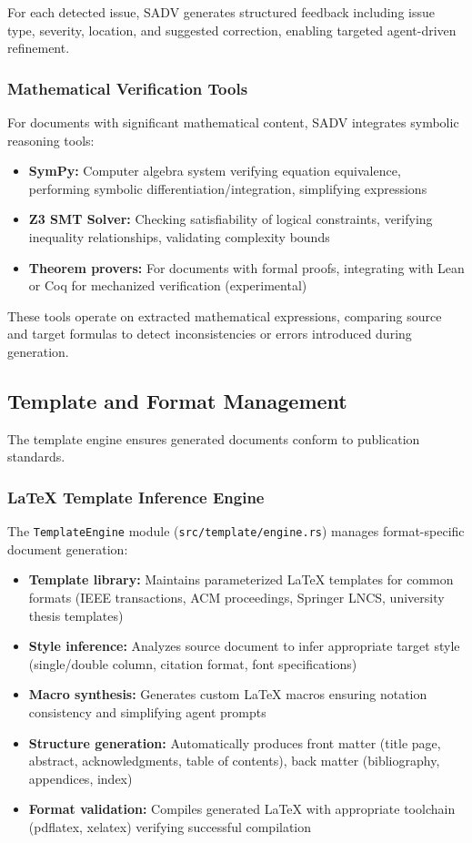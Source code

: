 \documentclass{ieeeaccess}
\begin{document}
For each detected issue, SADV generates structured feedback including issue type, severity, location, and suggested correction, enabling targeted agent-driven refinement.

\subsubsection{Mathematical Verification Tools}

For documents with significant mathematical content, SADV integrates symbolic reasoning tools:

\begin{itemize}
\item \textbf{SymPy:} Computer algebra system verifying equation equivalence, performing symbolic differentiation/integration, simplifying expressions
\item \textbf{Z3 SMT Solver:} Checking satisfiability of logical constraints, verifying inequality relationships, validating complexity bounds
\item \textbf{Theorem provers:} For documents with formal proofs, integrating with Lean or Coq for mechanized verification (experimental)
\end{itemize}

These tools operate on extracted mathematical expressions, comparing source and target formulas to detect inconsistencies or errors introduced during generation.

\subsection{Template and Format Management}

The template engine ensures generated documents conform to publication standards.

\subsubsection{LaTeX Template Inference Engine}

The \texttt{TemplateEngine} module (\texttt{src/template/engine.rs}) manages format-specific document generation:

\begin{itemize}
\item \textbf{Template library:} Maintains parameterized LaTeX templates for common formats (IEEE transactions, ACM proceedings, Springer LNCS, university thesis templates)
\item \textbf{Style inference:} Analyzes source document to infer appropriate target style (single/double column, citation format, font specifications)
\item \textbf{Macro synthesis:} Generates custom LaTeX macros ensuring notation consistency and simplifying agent prompts
\item \textbf{Structure generation:} Automatically produces front matter (title page, abstract, acknowledgments, table of contents), back matter (bibliography, appendices, index)
\item \textbf{Format validation:} Compiles generated LaTeX with appropriate toolchain (pdflatex, xelatex) verifying successful compilation
\end{itemize}
\end{document}
